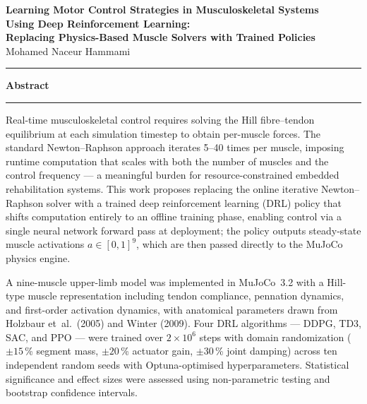 \documentclass[12pt, a4paper]{article}
\begin{document}

\begin{center}
  {\large\bfseries
    Learning Motor Control Strategies in Musculoskeletal Systems\\[4pt]
    Using Deep Reinforcement Learning:\\[2pt]
    Replacing Physics-Based Muscle Solvers with Trained Policies}\\[10pt]
  {\normalsize Mohamed Naceur Hammami 
   }\\[4pt]
\end{center}

\bigskip
\noindent\rule{\textwidth}{0.6pt}
\smallskip
\begin{center}{\large\bfseries Abstract}\end{center}
\smallskip
\noindent\rule{\textwidth}{0.6pt}
\bigskip

\noindent
Real-time musculoskeletal control requires solving the Hill fibre--tendon
equilibrium at each simulation timestep to obtain per-muscle forces. The
standard Newton--Raphson approach iterates 5--40 times per muscle, imposing
runtime computation that scales with both the number of muscles and the
control frequency --- a meaningful burden for resource-constrained embedded
rehabilitation systems. This work proposes replacing the online iterative
Newton--Raphson solver with a trained deep reinforcement learning (DRL)
policy that shifts computation entirely to an offline training phase,
enabling control via a single neural network forward pass at deployment;
the policy outputs steady-state muscle activations $a \in [0,1]^9$, which
are then passed directly to the MuJoCo physics engine.

\medskip\noindent
A nine-muscle upper-limb model was implemented in MuJoCo~3.2 with a
Hill-type muscle representation including tendon compliance, pennation
dynamics, and first-order activation dynamics, with anatomical parameters
drawn from Holzbaur et~al.\ (2005) and Winter (2009). Four DRL algorithms
--- DDPG, TD3, SAC, and PPO --- were trained over $2 \times 10^{6}$ steps
with domain randomization ($\pm15$\,\% segment mass, $\pm20$\,\% actuator
gain, $\pm30$\,\% joint damping) across ten independent random seeds with
Optuna-optimised hyperparameters. Statistical significance and effect sizes
were assessed using non-parametric testing and bootstrap confidence intervals.
\end{document}
